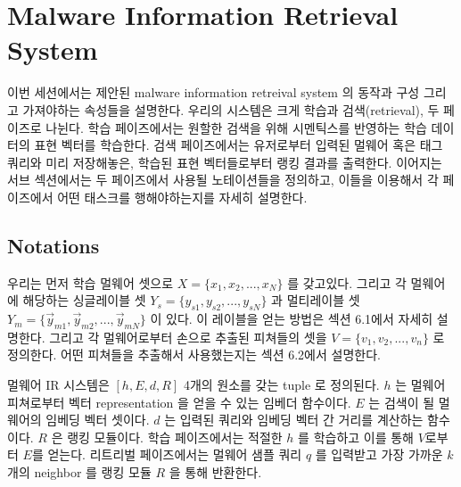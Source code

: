 \section{Malware Information Retrieval System}
이번 세션에서는 제안된 malware information retreival system 의 동작과 구성 그리고 가져야하는 속성들을 설명한다. 우리의 시스템은 크게 학습과 검색(retrieval), 두 페이즈로 나뉜다. 학습 페이즈에서는 원할한 검색을 위해 시멘틱스를 반영하는 학습 데이터의 표현 벡터를 학습한다. 검색 페이즈에서는 유저로부터 입력된 멀웨어 혹은 태그 쿼리와 미리 저장해놓은, 학습된 표현 벡터들로부터 랭킹 결과를 출력한다. 이어지는 서브 섹션에서는 두 페이즈에서 사용될 노테이션들을 정의하고, 이들을 이용해서 각 페이즈에서 어떤 태스크를 행해야하는지를 자세히 설명한다.  


\subsection{Notations}

우리는 먼저 학습 멀웨어 셋으로 $X = \{x_1, x_2, ..., x_N\}$ 를 갖고있다. 그리고 각 멀웨어에 해당하는 싱글레이블 셋 $Y_s = \{y_{s1}, y_{s2}, ..., y_{sN}\}$ 과 멀티레이블 셋 $Y_m = \{\vec{y}_{m1}, \vec{y}_{m2}, ... , \vec{y}_{mN}\}$ 이 있다. 이 레이블을 얻는 방법은 섹션 6.1에서 자세히 설명한다. 그리고 각 멀웨어로부터 손으로 추출된 피쳐들의 셋을 $V = \{v_1, v_2, ..., v_n \}$ 로 정의한다. 어떤 피쳐들을 추출해서 사용했는지는 섹션 6.2에서 설명한다. 

멀웨어 IR 시스템은 $[h, E, d, R]$ 4개의 원소를 갖는 tuple 로 정의된다. $h$ 는 멀웨어 피쳐로부터 벡터 representation 을 얻을 수 있는 임베더 함수이다. $E$ 는 검색이 될 멀웨어의 임베딩 벡터 셋이다. $d$ 는 입력된 쿼리와 임베딩 벡터 간 거리를 계산하는 함수이다. $R$ 은 랭킹 모듈이다. 학습 페이즈에서는 적절한 $h$ 를 학습하고 이를 통해 $V$로부터 $E$를 얻는다. 리트리벌 페이즈에서는 멀웨어 샘플 쿼리 $q$ 를 입력받고 가장 가까운 $k$ 개의 neighbor 를 랭킹 모듈 $R$ 을 통해 반환한다.

